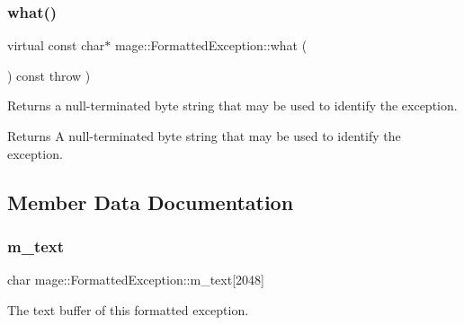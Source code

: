 \subsubsection{\texorpdfstring{what()}{what()}}
{\footnotesize\ttfamily virtual const char$\ast$ mage\+::\+Formatted\+Exception\+::what (\begin{DoxyParamCaption}{ }\end{DoxyParamCaption}) const throw  ) \hspace{0.3cm}{\ttfamily [virtual]}}

Returns a null-\/terminated byte string that may be used to identify the exception.

\begin{DoxyReturn}{Returns}
A null-\/terminated byte string that may be used to identify the exception. 
\end{DoxyReturn}


\subsection{Member Data Documentation}
\hypertarget{structmage_1_1_formatted_exception_aadccdcc1db09285dadc6b5a30681e05b}{}\label{structmage_1_1_formatted_exception_aadccdcc1db09285dadc6b5a30681e05b} 
\subsubsection{\texorpdfstring{m\+\_\+text}{m\_text}}
{\footnotesize\ttfamily char mage\+::\+Formatted\+Exception\+::m\+\_\+text\mbox{[}2048\mbox{]}\hspace{0.3cm}{\ttfamily [private]}}

The text buffer of this formatted exception. 